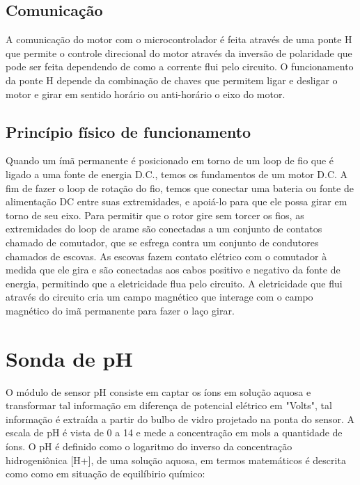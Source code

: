 \subsection{Comunicação}

A comunicação do motor com o microcontrolador é feita através de uma ponte H que permite o controle direcional do motor através da inversão de polaridade que pode ser feita dependendo de como a corrente flui pelo circuito. O funcionamento da ponte H depende da combinação de chaves que permitem ligar e desligar o motor e girar em sentido horário ou anti-horário o eixo do motor.

\subsection{Princípio físico de funcionamento}

Quando um ímã permanente é posicionado em torno de um loop de fio que é ligado a uma fonte de energia D.C., temos os fundamentos de um motor D.C. A fim de fazer o loop de rotação do fio, temos que conectar uma bateria ou fonte de alimentação DC entre suas extremidades, e apoiá-lo para que ele possa girar em torno de seu eixo. Para permitir que o rotor gire sem torcer os fios, as extremidades do loop de arame são conectadas a um conjunto de contatos chamado de comutador, que se esfrega contra um conjunto de condutores chamados de escovas. As escovas fazem contato elétrico com o comutador à medida que ele gira e são conectadas aos cabos positivo e negativo da fonte de energia, permitindo que a eletricidade flua pelo circuito. A eletricidade que flui através do circuito cria um campo magnético que interage com o campo magnético do imã permanente para fazer o laço girar\cite{page1999}.

\section{Sonda de pH}

O módulo de sensor pH consiste em captar os íons em solução aquosa e transformar tal informação
em diferença de potencial elétrico em "Volts", tal informação é extraída a partir do bulbo de vidro
projetado na ponta do sensor. A escala de pH é vista de 0 a 14 e mede a concentração em mols a
quantidade de íons. O pH é definido como o logaritmo do inverso da concentração hidrogeniônica
[H+], de uma solução aquosa, em termos matemáticos é descrita como como em situação de
equilíbirio químico\cite{atkins2011}:

